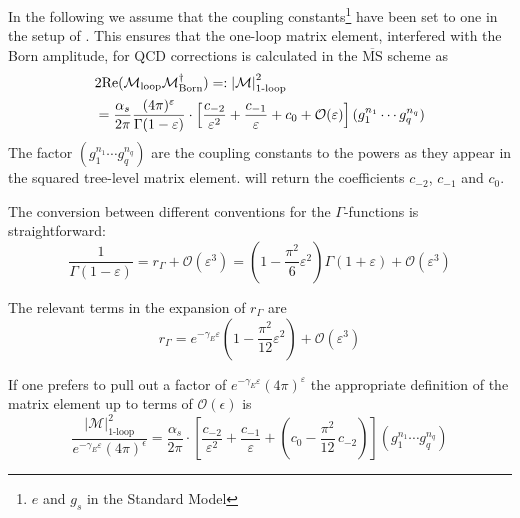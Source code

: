 In the following we assume that the coupling constants\footnote{
$e$ and $g_s$ in the Standard Model} have been set to one in the
setup of \gosamv{}. This ensures that the one-loop matrix
element, interfered with the Born amplitude, for QCD corrections is calculated in the $\overline{\mathrm{MS}}$ scheme as
\begin{align}
&2{\mathrm{Re}}({\cal M}_{\mathrm{loop}}{\cal
                M}_{\mathrm{Born}}^\dagger)=:\left\vert\mathcal{M}\right\vert^2_{\text{1-loop}}\nonumber\\
  &=
\frac{\alpha_s}{2\pi}\frac{(4\pi)^\varepsilon}{\Gamma(1-\varepsilon)}
\cdot\left[\frac{c_{-2}}{\varepsilon^2}+\frac{c_{-1}}{\varepsilon}+c_0
+{\mathcal{O}}(\varepsilon)\right](g_1^{n_1}\cdots g_q^{n_q}) \label{eq:Conventions:nlo_matrix_element}
\end{align}
The factor $(g_1^{n_1}\cdots g_q^{n_q})$ are the coupling constants
to the powers as they appear in the squared tree-level matrix element. \gosamv{} will
return the coefficients $c_{-2}$, $c_{-1}$ and $c_0$.

The conversion between different conventions for the $\Gamma$-functions
is straightforward:
\begin{equation}
\frac{1}{\Gamma(1-\varepsilon)}=r_\Gamma+{\mathcal O}(\varepsilon^3)=
\left(1-\frac{\pi^2}{6}\varepsilon^2\right)\Gamma(1+\varepsilon)
   +{\mathcal O}(\varepsilon^3)
\end{equation}

The relevant terms in the expansion of $r_\Gamma$ are
\begin{equation}
r_\Gamma=e^{-\gamma_E\varepsilon}
\left(1-\frac{\pi^2}{12}\varepsilon^2\right)+\mathcal{O}(\varepsilon^3)
\end{equation}

If one prefers to pull out a factor of
$e^{-\gamma_E\varepsilon}(4\pi)^{\varepsilon}$ the appropriate
definition of the matrix element up to terms of $\mathcal{O}(\epsilon)$ is
\begin{equation}
\frac{\left\vert\mathcal{M}\right\vert^2_{\text{1-loop}}}%
{e^{-\gamma_E\varepsilon}(4\pi)^\epsilon}=
\frac{\alpha_s}{2\pi}
\cdot\left[\frac{c_{-2}}{\varepsilon^2}+\frac{c_{-1}}{\varepsilon}
+\left(c_0-\frac{\pi^2}{12}\,c_{-2}\right)
\right](g_1^{n_1}\cdots g_q^{n_q})
\end{equation}


